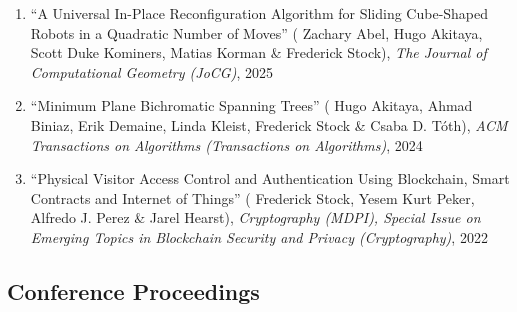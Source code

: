 \documentclass[letterpaper,11pt]{article}
\makeatletter
\newcommand{\resumeSubHeadingListStart}{\begin{itemize}[leftmargin=*]}
\newcommand{\resumeSubHeadingListEnd}{\end{itemize}}
\newcommand{\publication}[6]{
  \item ``#1'' %
   (\ignorespaces#2), %
     \emph{#3}, %
      #4%


}
\newcommand{\pdficon}{\faFilePdf}
\newcommand{\doilabel}{\texttt{DOI}}
\makeatother
\begin{document}
    \begin{enumerate}
    \setcounter{enumi}{\value{pubnum}}
      
        \publication
          {A Universal In-Place Reconfiguration Algorithm for Sliding Cube-Shaped Robots in a Quadratic Number of Moves}
          {
 Zachary Abel, Hugo Akitaya, Scott Duke Kominers, Matias Korman \& Frederick Stock}
          {The Journal of Computational Geometry (JoCG)}
          {2025}
          {%
\href{https://jocg.org/index.php/jocg/article/view/5625/4061}{\pdficon}%
%
\quad\href{https://doi.org/10.20382/jocg.v16i2a11}{\doilabel}%
          }
          {1}
 \vspace{-.5em}  
      
        \publication
          {Minimum Plane Bichromatic Spanning Trees}
          {
 Hugo Akitaya, Ahmad Biniaz, Erik Demaine, Linda Kleist, Frederick Stock \& Csaba D. Tóth}
          {ACM Transactions on Algorithms (Transactions on Algorithms)}
          {2024}
          {%
\href{fred-stock.github.io/docstore/MPBST-Transactions.pdf}{\pdficon}%
%
\quad\href{https://doi.org/10.1145/3747591}{\doilabel}%
          }
          {2}
 \vspace{-.5em}  
      
        \publication
          {Physical Visitor Access Control and Authentication Using Blockchain, Smart Contracts and Internet of Things}
          {
 Frederick Stock, Yesem Kurt Peker, Alfredo J. Perez \& Jarel Hearst}
          {Cryptography (MDPI), Special Issue on Emerging Topics in Blockchain Security and Privacy (Cryptography)}
          {2022}
          {%
\href{fred-stock.github.io/docstore/Blockchain-AccessControl-MDPI.pdf}{\pdficon}%
%
\quad\href{https://doi.org/10.3390/cryptography6040065}{\doilabel}%
          }
          {3}
 
    \setcounter{pubnum}{\value{enumi}}
    \end{enumerate}
    \subsection*{Conference Proceedings}%
  
\end{document}
